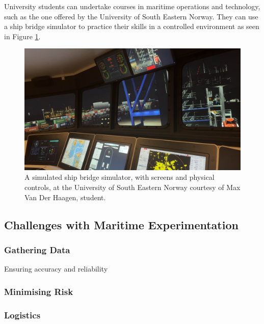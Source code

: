 \documentclass[12pt]{article}
\begin{document}
University students can undertake courses in maritime operations and technology, such as the one offered by the University of South Eastern Norway. They can use a ship bridge simulator to practice their skills in a controlled environment as seen in Figure \ref{fig:maxvdhnorway}.

\begin{figure}[h]
  \centering
  \begin{minipage}[b]{0.9\linewidth}
    \includegraphics[width=\linewidth]{images/max_vdh_norway.jpg}
    \caption{A simulated ship bridge simulator, with screens and physical controls, at the University of South Eastern Norway courtesy of Max Van Der Haagen, student.}
    \label{fig:maxvdhnorway}
  \end{minipage}
\end{figure}

\subsection{Challenges with Maritime Experimentation}


\subsubsection{Gathering Data}

Ensuring accuracy and reliability

\subsubsection{Minimising Risk}

\subsubsection{Logistics}
\end{document}
